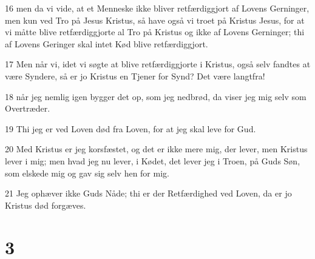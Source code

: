 \par 16 men da vi vide, at et Menneske ikke bliver retfærdiggjort af Lovens Gerninger, men kun ved Tro på Jesus Kristus, så have også vi troet på Kristus Jesus, for at vi måtte blive retfærdiggjorte al Tro på Kristus og ikke af Lovens Gerninger; thi af Lovens Geringer skal intet Kød blive retfærdiggjort.
\par 17 Men når vi, idet vi søgte at blive retfærdiggjorte i Kristus, også selv fandtes at være Syndere, så er jo Kristus en Tjener for Synd? Det være langtfra!
\par 18 når jeg nemlig igen bygger det op, som jeg nedbrød, da viser jeg mig selv som Overtræder.
\par 19 Thi jeg er ved Loven død fra Loven, for at jeg skal leve for Gud.
\par 20 Med Kristus er jeg korsfæstet, og det er ikke mere mig, der lever, men Kristus lever i mig; men hvad jeg nu lever, i Kødet, det lever jeg i Troen, på Guds Søn, som elskede mig og gav sig selv hen for mig.
\par 21 Jeg ophæver ikke Guds Nåde; thi er der Retfærdighed ved Loven, da er jo Kristus død forgæves.

\chapter{3}

